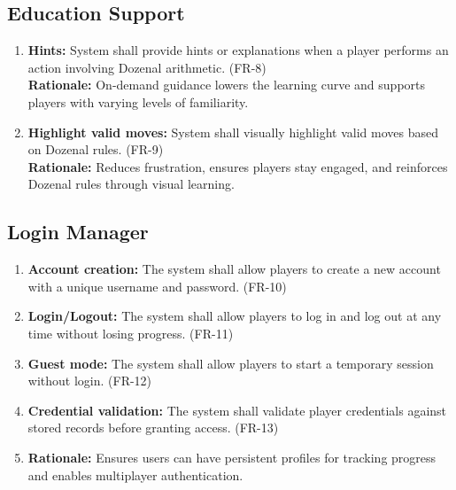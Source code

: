 \documentclass[12pt]{article}
\begin{document}
\subsection{Education Support}

\begin{enumerate}
    \item \textbf{Hints:} System shall provide hints or explanations when a player performs an action involving Dozenal arithmetic. (FR-8) \\
    \textbf{Rationale:} On-demand guidance lowers the learning curve and supports players with varying levels of familiarity.

    \item \textbf{Highlight valid moves:} System shall visually highlight valid moves based on Dozenal rules. (FR-9) \\
    \textbf{Rationale:} Reduces frustration, ensures players stay engaged, and reinforces Dozenal rules through visual learning.
\end{enumerate}

\subsection{Login Manager}
\begin{enumerate}
    \item \textbf{Account creation:} The system shall allow players to create a new account with a unique username and password. (FR-10)
    \item \textbf{Login/Logout:} The system shall allow players to log in and log out at any time without losing progress. (FR-11)
    \item \textbf{Guest mode:} The system shall allow players to start a temporary session without login. (FR-12)
    \item \textbf{Credential validation:} The system shall validate player credentials against stored records before granting access. (FR-13)
    \item \textbf{Rationale:} Ensures users can have persistent profiles for tracking progress and enables multiplayer authentication.
\end{enumerate}
\end{document}
